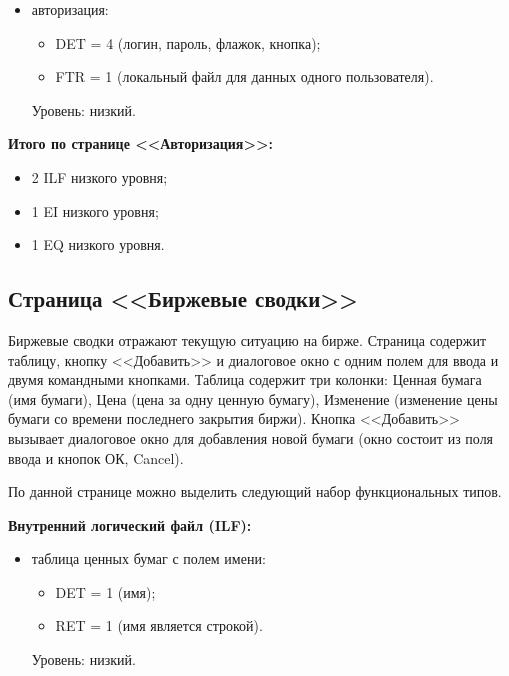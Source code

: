 \documentclass{bmstu}
\begin{document}
\begin{itemize}
    \item авторизация:
    \begin{itemize}
        \item DET = 4 (логин, пароль, флажок, кнопка);
        \item FTR = 1 (локальный файл для данных одного пользователя).
    \end{itemize}
    Уровень: низкий.
\end{itemize}

\textbf{Итого по странице <<Авторизация>>:}

\begin{itemize}
    \item 2 ILF низкого уровня;
    \item 1 EI низкого уровня;
    \item 1 EQ низкого уровня.
\end{itemize}

\clearpage

\subsection*{Страница <<Биржевые сводки>>}


Биржевые сводки отражают текущую ситуацию на бирже. Страница содержит таблицу, кнопку <<Добавить>> и диалоговое окно с одним полем для ввода и двумя командными кнопками. Таблица содержит три колонки: Ценная бумага (имя бумаги), Цена (цена за одну ценную бумагу), Изменение (изменение цены бумаги со времени последнего закрытия биржи). Кнопка <<Добавить>> вызывает диалоговое окно для добавления новой бумаги (окно состоит из поля ввода и кнопок ОК, Cancel).

По данной странице можно выделить следующий набор функциональных типов.


\textbf{Внутренний логический файл (ILF):}

\begin{itemize}
    \item таблица ценных бумаг с полем имени:
    \begin{itemize}
        \item DET = 1 (имя);
        \item RET = 1 (имя является строкой).
    \end{itemize}
    Уровень: низкий.
\end{itemize}
\end{document}
